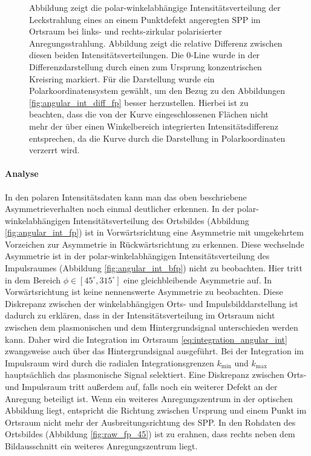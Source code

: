 \documentclass[titlepage,  ngerman]{article}
\begin{document}
\begin{figure}
			\caption{Abbildung  zeigt die polar-winkelabhängige Intensitätsverteilung der Leckstrahlung eines an einem Punktdefekt angeregten SPP im Ortsraum bei links- und rechts-zirkular polarisierter Anregungsstrahlung. Abbildung  zeigt die relative Differenz zwischen diesen beiden Intensitätsverteilungen. Die $0$-Line wurde in der Differenzdarstellung durch einen zum Ursprung konzentrischen Kreisring markiert. Für die Darstellung wurde ein Polarkoordinatensystem gewählt, um den Bezug zu den Abbildungen \ref{fig:angular_int_diff_fp} besser herzustellen. Hierbei ist zu beachten, dass die von der Kurve eingeschlossenen Flächen nicht mehr der über einen Winkelbereich integrierten Intensitätsdifferenz entsprechen, da die Kurve durch die Darstellung in Polarkoordinaten verzerrt wird.}
			\label{fig:angular_dist_bfp}
		\end{figure}
		\paragraph{Analyse}
		In den polaren Intensitätsdaten kann man das oben beschriebene Asymmetrieverhalten noch einmal deutlicher erkennen. In der polar-winkelabhängigen Intensitätsverteilung des Ortsbildes (Abbildung \ref{fig:angular_int_fp}) ist in Vorwärtsrichtung eine Asymmetrie mit umgekehrtem Vorzeichen zur Asymmetrie in Rückwärtsrichtung zu erkennen. Diese wechselnde Asymmetrie ist in der polar-winkelabhängigen Intensitätsverteilung des Impulsraumes (Abbildung \ref{fig:angular_int_bfp}) nicht zu beobachten. Hier tritt in dem Bereich $\phi \in [45^\circ, 315^\circ]$ eine gleichbleibende Asymmetrie auf. In Vorwärtsrichtung ist keine nennenswerte Asymmetrie zu beobachten. Diese Diskrepanz zwischen der winkelabhängigen Orts- und Impulsbilddarstellung ist dadurch zu erklären, dass in der Intensitätsverteilung im Ortsraum nicht zwischen dem plasmonischen und dem Hintergrundsignal unterschieden werden kann. Daher wird die Integration im Ortsraum \eqref{eq:integration_angular_int} zwangsweise auch über das Hintergrundsignal ausgeführt. Bei der Integration im Impulsraum wird durch die radialen Integrationsgrenzen $k_\mathrm{min}$ und $k_\mathrm{max}$ hauptsächlich das plasmonische Signal selektiert. Eine Diskrepanz zwischen Orts- und Impulsraum tritt außerdem auf, falls noch ein weiterer Defekt an der Anregung beteiligt ist. Wenn ein weiteres Anregungszentrum in der optischen Abbildung liegt, entspricht die Richtung zwischen Ursprung und einem Punkt im Ortsraum nicht mehr der Ausbreitungsrichtung des SPP. In den Rohdaten des Ortsbildes (Abbildung \ref{fig:raw_fp_45}) ist zu erahnen, dass rechts neben dem Bildausschnitt ein weiteres Anregungszentrum liegt.	
	\FloatBarrier
\end{document}
